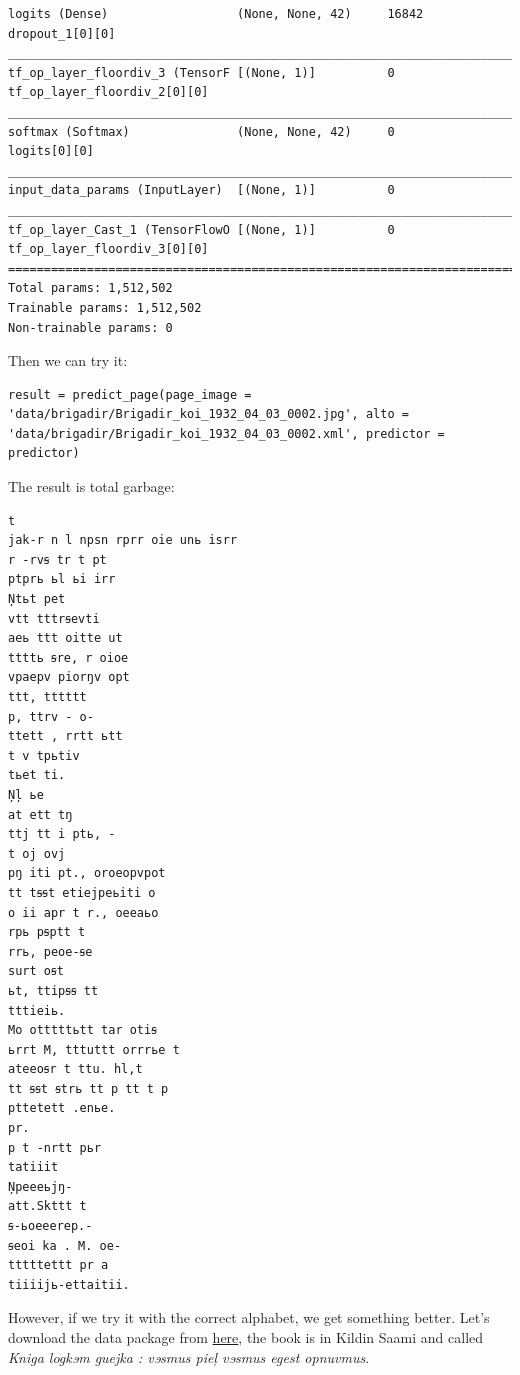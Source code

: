 \documentclass[]{book}
\begin{document}
\begin{verbatim}
logits (Dense)                  (None, None, 42)     16842       dropout_1[0][0]                  
__________________________________________________________________________________________________
tf_op_layer_floordiv_3 (TensorF [(None, 1)]          0           tf_op_layer_floordiv_2[0][0]     
__________________________________________________________________________________________________
softmax (Softmax)               (None, None, 42)     0           logits[0][0]                     
__________________________________________________________________________________________________
input_data_params (InputLayer)  [(None, 1)]          0                                            
__________________________________________________________________________________________________
tf_op_layer_Cast_1 (TensorFlowO [(None, 1)]          0           tf_op_layer_floordiv_3[0][0]     
==================================================================================================
Total params: 1,512,502
Trainable params: 1,512,502
Non-trainable params: 0
\end{verbatim}

Then we can try it:

\begin{verbatim}
result = predict_page(page_image = 'data/brigadir/Brigadir_koi_1932_04_03_0002.jpg', alto = 'data/brigadir/Brigadir_koi_1932_04_03_0002.xml', predictor = predictor)
\end{verbatim}

The result is total garbage:

\begin{verbatim}
t
jak-r n l npsn rprr oie unь isrr
r -rvꞩ tr t pt
ptprь ьl ьi irr
Ņtьt pet
vtt tttrꞩevti
aeь ttt oitte ut
ttttь ꞩre, r oioe
vpaepv piorŋv opt
ttt, tttttt
p, ttrv - o-
ttett , rrtt ьtt
t v tpьtiv
tьet ti.
Ņļ ьe
at ett tŋ
ttj tt i ptь, -
t oj ovj
pŋ iti pt., oroeopvpot
tt tꞩꞩt etiejpeьiti o
o ii apr t r., oeeaьo
rpь pꞩptt t
rrь, peoe-ꞩe
surt oꞩt
ьt, ttipꞩꞩ tt
tttieiь.
Mo otttttьtt tar otiꞩ
ьrrt M, tttuttt orrrьe t
ateeoꞩr t ttu. hl,t
tt ꞩꞩt ꞩtrь tt p tt t p
pttetett .enьe.
pr.
p t -nrtt pьr
tatiiit
Ņpeeeьjŋ-
att.Skttt t
ꞩ-ьoeeerep.-
ꞩeoi ka . M. oe-
tttttettt pr a
tiiiijь-ettaitii.
\end{verbatim}

However, if we try it with the correct alphabet, we get something better. Let's download the data package from \href{https://fennougrica.kansalliskirjasto.fi/handle/10024/89663}{here}, the book is in Kildin Saami and called \emph{Kniga logkɘm guejka : vɘsmus pieļ vɘsmus egest opnuvmus}.
\end{document}
